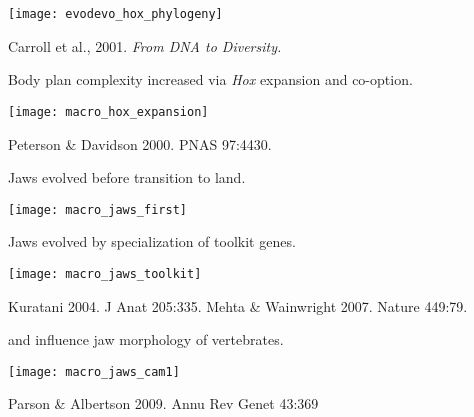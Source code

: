 \documentclass[t]{beamer}
\newcommand{\backskip}{\vspace{-0.5\baselineskip}}
\begin{document}

\begin{frame}

\centering

\texttt{[image: evodevo\_hox\_phylogeny]}

\tinyfill Carroll et al., 2001. \textit{From DNA to Diversity.}
\end{frame}



\begin{frame}{Body plan complexity increased via \emph{Hox} expansion and co-option.}

\backskip

\centering

\texttt{[image: macro\_hox\_expansion]}

\tinyfill Peterson \& Davidson 2000. PNAS 97:4430.

\end{frame}


\begin{frame}{Jaws evolved before transition to land.}
\backskip

\centering

\texttt{[image: macro\_jaws\_first]}

\end{frame}

\begin{frame}{Jaws evolved by specialization of toolkit genes.}


\centering

\texttt{[image: macro\_jaws\_toolkit]}

\tinyfill Kuratani 2004. J Anat 205:335. Mehta \& Wainwright 2007. Nature 449:79.

\end{frame}

\begin{frame}{ and  influence jaw morphology of vertebrates.}

\backskip

\centering

\texttt{[image: macro\_jaws\_cam1]}

\tinyfill Parson \& Albertson 2009. Annu Rev Genet 43:369


\end{frame}
\end{document}
